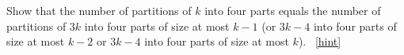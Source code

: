 \documentclass{book}
\begin{document}
\setcounter{project}{307}
\addtocounter{project}{-1}
\begin{activity}[]\label{rectanglecomplement}
\hypertarget{p-1554}{}%
Show that the number of partitions of \(k\) into four parts equals the number of partitions of \(3k\) into four parts of size at most \(k-1\) (or \(3k-4\) into four parts of size at most \(k-2\) or \(3k-4\) into four parts of size at most \(k\)).%
~\hfill{\tiny\hyperlink{a-307}{[hint]}\hypertarget{q-307}{}}\end{activity}
\end{document}
